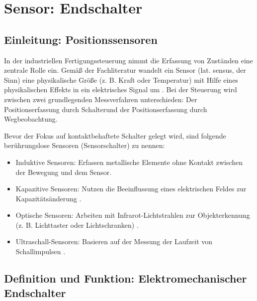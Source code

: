 %
%

\chapter{Sensor: Endschalter}


\section{Einleitung: Positionssensoren}

In der industriellen Fertigungssteuerung nimmt die Erfassung von Zuständen eine zentrale Rolle ein. Gemäß der Fachliteratur wandelt ein Sensor (lat. sensus, der Sinn) \glqq  eine physikalische Größe (z. B. Kraft oder Temperatur) mit Hilfe eines physikalischen Effekts in ein elektrisches Signal um\grqq{} \cite[433]{Hering:2012}. Bei der Steuerung wird zwischen zwei grundlegenden Messverfahren unterschieden: Der \glqq Positionserfassung durch Schalter\grqq{}und der \glqq Positionserfassung durch Wegbeobachtung\grqq{}.
\cite[435]{Hering:2012}

Bevor der Fokus auf kontaktbehaftete Schalter gelegt wird, sind folgende berührungslose Sensoren (Sensorschalter) zu nennen:

\begin{itemize}
	\item Induktive Sensoren: Erfassen metallische Elemente \glqq ohne Kontakt zwischen der Bewegung und dem Sensor\grqq{}\cite[436]{Hering:2012}.
	\item Kapazitive Sensoren: Nutzen die Beeinflussung eines elektrischen Feldes zur Kapazitätsänderung \cite[438]{Hering:2012}.
	\item Optische Sensoren: Arbeiten mit Infrarot-Lichtstrahlen zur Objekterkennung (z. B. Lichttaster oder Lichtschranken) \cite[440]{Hering:2012}.
	\item Ultraschall-Sensoren: Basieren auf der Messung der Laufzeit von Schallimpulsen \cite[443]{Hering:2012}.
\end{itemize}

\section{Definition und Funktion: Elektromechanischer Endschalter}

